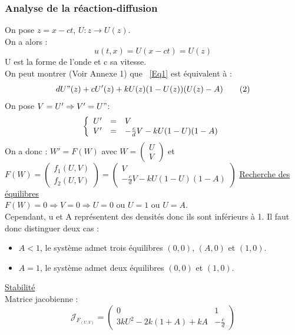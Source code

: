\documentclass[a4paper,11pt]{article}
\begin{document}
\subsubsection{Analyse de la réaction-diffusion}
\noindent On pose $z=x-ct$, $U:z\rightarrow U(z)$.\\
On a alors : 
\begin{equation}
u(t,x)=U(x-ct)=U(z)
\tag{1}
\label{Eq1}
\end{equation}
U est la forme de l'onde et c sa vitesse.\\
On peut montrer (Voir Annexe 1) que ~\eqref{Eq1} est équivalent à :
\begin{equation}
dU"(z)+cU'(z)+kU(z)(1-U(z))(U(z)-A)
\tag{2}
\end{equation} 
On pose $V=U' \Rightarrow V'=U"$:
\[
\left\{
\begin{array}{r c l}
U' &=& V\\
V' &=& -\frac{c}{d}V-kU(1-U)(1-A)
\end{array}
\right.
\]
On a donc : $W'=F(W)$ avec $W=\begin{pmatrix} U \\ V \end{pmatrix}$ et $F(W)=\begin{pmatrix} f_1(U,V) \\ f_2(U,V) \end{pmatrix}=\begin{pmatrix} V \\ -\frac{c}{d}V-kU(1-U)(1-A) \end{pmatrix}$
\newline
\newline
\underline{Recherche des équilibres}\\
$F(W)=0 \Rightarrow V=0 \Rightarrow U=0 \text{ ou } U=1 \text{ ou } U=A$.\\
Cependant, u et A représentent des densités donc ils sont inférieurs à 1. Il faut donc distinguer deux cas :
\begin{itemize}
	\item $A<1$, le système admet trois équilibres $(0,0)$, $(A,0)$ et $(1,0)$.
    \item $A=1$, le système admet deux équilibres $(0,0)$ et $(1,0)$.
\end{itemize}
\vspace{0.5cm}
\underline{Stabilité}\\
Matrice jacobienne : $$\mathcal{J}_{F_{(U,V)}}=\begin{pmatrix} 0 & 1 \\ 3kU^2-2k(1+A)+kA & -\frac{c}{d}\end{pmatrix}$$
\end{document}
